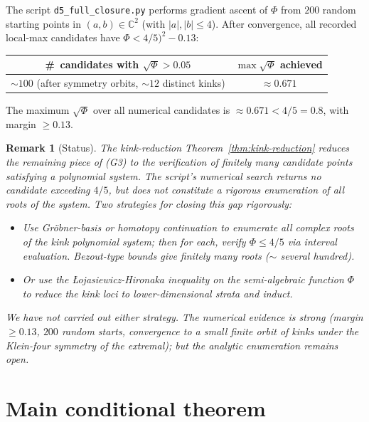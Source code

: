 \documentclass[11pt,a4paper]{article}
\newtheorem{remark}[theorem]{Remark}
\begin{document}
The script \verb|d5_full_closure.py| performs gradient ascent of
$\Phi$ from $200$ random starting points in $(a,b)\in\mathbb{C}^2$
(with $|a|,|b|\le 4$). After convergence, all recorded local-max
candidates have $\Phi<4/5)^2 - 0.13$:
\begin{center}
\begin{tabular}{cc}
\toprule
\#\, candidates with $\sqrt\Phi > 0.05$ & $\max\sqrt\Phi$ achieved \\
\midrule
$\sim 100$ (after symmetry orbits, $\sim 12$ distinct kinks) & $\approx 0.671$ \\
\bottomrule
\end{tabular}
\end{center}
The maximum $\sqrt{\Phi}$ over all numerical candidates is $\approx
0.671 < 4/5 = 0.8$, with margin $\ge 0.13$.

\begin{remark}[Status]
The kink-reduction Theorem~\ref{thm:kink-reduction} reduces the
remaining piece of (G3) to the verification of finitely many
candidate points satisfying a polynomial system. The script's
numerical search returns no candidate exceeding $4/5$, but does not
constitute a rigorous enumeration of all roots of the system. Two
strategies for closing this gap rigorously:
\begin{itemize}
\item Use Gröbner-basis or homotopy continuation to enumerate all
  complex roots of the kink polynomial system; then for each, verify
  $\Phi\le 4/5$ via interval evaluation. Bezout-type bounds give
  finitely many roots ($\sim$ several hundred).
\item Or use the Łojasiewicz-Hironaka inequality on the semi-algebraic
  function $\Phi$ to reduce the kink loci to lower-dimensional strata
  and induct.
\end{itemize}
We have not carried out either strategy. The numerical evidence is
strong (margin $\ge 0.13$, $200$ random starts, convergence to a
small finite orbit of kinks under the Klein-four symmetry of the
extremal); but the analytic enumeration remains open.
\end{remark}

\section{Main conditional theorem}
\end{document}
